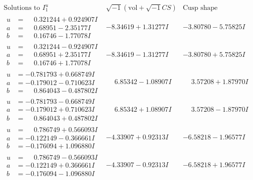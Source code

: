 \documentclass[1p]{elsarticle_modified}
\theoremstyle{definition}
\newcommand{\I}{\sqrt{-1}}
\begin{document}
$$\begin{array}{c|c|c}  
\text{Solutions to }I^u_{1}& \I (\text{vol} + \sqrt{-1}CS) & \text{Cusp shape}\\
 \hline 
\begin{aligned}
u &= \phantom{-}0.321244 + 0.924907 I \\
a &= \phantom{-}0.68951 - 2.35177 I \\
b &= \phantom{-}0.16746 - 1.77078 I\end{aligned}
 & -8.34619 + 1.31277 I & -3.80780 - 5.75825 I \\ \hline\begin{aligned}
u &= \phantom{-}0.321244 - 0.924907 I \\
a &= \phantom{-}0.68951 + 2.35177 I \\
b &= \phantom{-}0.16746 + 1.77078 I\end{aligned}
 & -8.34619 - 1.31277 I & -3.80780 + 5.75825 I \\ \hline\begin{aligned}
u &= -0.781793 + 0.668749 I \\
a &= -0.179012 - 0.710623 I \\
b &= \phantom{-}0.864043 - 0.487802 I\end{aligned}
 & \phantom{-}6.85342 - 1.08907 I & \phantom{-}3.57208 + 1.87970 I \\ \hline\begin{aligned}
u &= -0.781793 - 0.668749 I \\
a &= -0.179012 + 0.710623 I \\
b &= \phantom{-}0.864043 + 0.487802 I\end{aligned}
 & \phantom{-}6.85342 + 1.08907 I & \phantom{-}3.57208 - 1.87970 I \\ \hline\begin{aligned}
u &= \phantom{-}0.786749 + 0.566093 I \\
a &= -0.122149 - 0.366661 I \\
b &= -0.176094 + 1.096880 I\end{aligned}
 & -4.33907 + 0.92313 I & -6.58218 - 1.96577 I \\ \hline\begin{aligned}
u &= \phantom{-}0.786749 - 0.566093 I \\
a &= -0.122149 + 0.366661 I \\
b &= -0.176094 - 1.096880 I\end{aligned}
 & -4.33907 - 0.92313 I & -6.58218 + 1.96577 I \\ \hline\begin{aligned}

\end{aligned}
\end{array}$$
\end{document}
